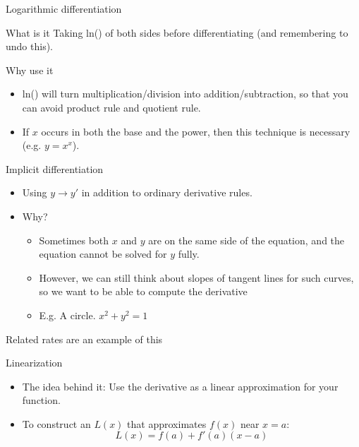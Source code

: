 \documentclass{beamer}
\begin{document}
\begin{frame}[label={sec:org8e01da0}]{Logarithmic differentiation}
  \begin{block}{What is it}
    Taking ln() of both sides before differentiating (and remembering to undo this).
  \end{block}

  \begin{block}{Why use it}
    \begin{itemize}
    \item ln() will turn multiplication/division into addition/subtraction, so that you can avoid product rule and quotient rule.
    \item If \(x\) occurs in both the base and the power, then this technique is necessary (e.g. $y = x^x$).
    \end{itemize}
  \end{block}
\end{frame}

\begin{frame}[label={sec:orgfecd3ee}]{Implicit differentiation}
\begin{itemize}
\item Using \(y \to y'\) in addition to ordinary derivative rules.
\item Why?
\begin{itemize}
\item Sometimes both \(x\) and \(y\) are on the same side of the equation, and the equation cannot be solved for \(y\) fully.
\item However, we can still think about slopes of tangent lines for such curves, so we want to be able to compute the derivative
\item E.g. A circle. \(x^2 + y^2 = 1\)
\end{itemize}
\end{itemize}

Related rates are an example of this
\end{frame}

\begin{frame}[label={sec:org54f2f5a}]{Linearization}
\begin{itemize}
\item The idea behind it: Use the derivative as a linear approximation for your function.

\item To construct an \(L(x)\) that approximates \(f(x)\) near \(x=a\):
\[
    L(x) = f(a) + f'(a)(x-a)
    \]
\end{itemize}
\end{frame}
\end{document}
